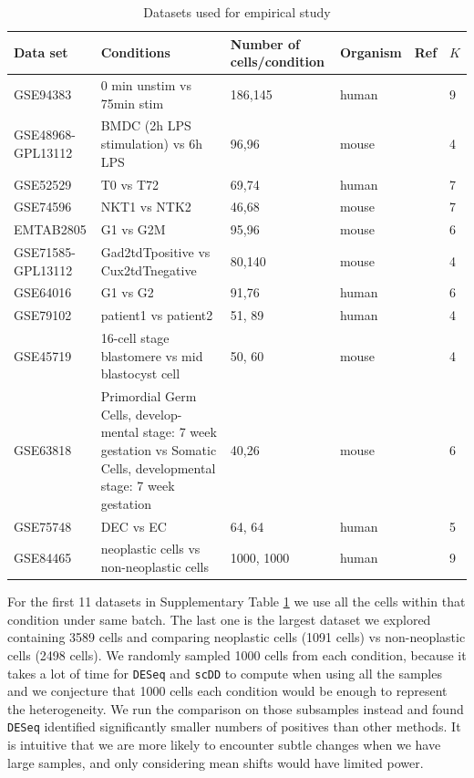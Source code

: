\documentclass[aoas,preprint]{imsart}
\begin{document}
\begin{table}[h!]
\small
\centering
\begin{tabular}{ |p{2cm}|p{5cm}|p{2cm}|p{2cm}|p{2cm}|p{1cm}|}
\hline
 Data set & Conditions & Number of cells/condition & Organism  & Ref & $K$\\ \hline \hline
GSE94383 & 0 min unstim vs 75min stim & 186,145 & human & \citep{Lane} & 9\\ \hline
GSE48968-GPL13112 & BMDC (2h LPS stimulation) vs 6h LPS & 96,96 & mouse & \citep{Shalek} & 4\\ \hline
GSE52529 & T0 vs T72 & 69,74 & human & \citep{Trapnell} & 7\\ \hline
GSE74596 & NKT1 vs NTK2 & 46,68 & mouse & \citep{Engel} & 7\\ \hline
EMTAB2805 & G1 vs G2M & 95,96 & mouse & \citep{EMTAB} & 6\\ \hline
GSE71585-GPL13112 &Gad2tdTpositive vs Cux2tdTnegative  & 80,140 & mouse & \citep{Tasic} & 4\\ \hline
GSE64016 & G1 vs G2 & 91,76 & human & \citep{oscope} & 6\\ \hline
GSE79102 & patient1 vs patient2 & 51, 89 & human & \cite{sc3} & 4\\ \hline
GSE45719 & 16-cell stage blastomere vs mid blastocyst cell & 50, 60 & mouse & \citep{Deng193} & 4\\ \hline
GSE63818 & Primordial Germ Cells, develop- mental stage: 7 week gestation vs Somatic Cells, developmental stage: 7 week gestation & 40,26 & mouse & \citep{Guo} & 6\\ \hline
GSE75748 & DEC vs EC & 64, 64 & human & \citep{chu} & 5\\ \hline
GSE84465 & neoplastic cells vs non-neoplastic cells & 1000, 1000 & human & \citep{Darmanis} & 9\\ \hline
\end{tabular}
\caption{Datasets used for empirical study}
\label{table:1}
\end{table}

For the first 11 datasets in Supplementary Table \ref{table:1} we use all the cells within that condition under same batch.
The last one is the largest dataset we explored containing 3589 cells and comparing neoplastic cells (1091 cells) vs non-neoplastic cells (2498 cells).
We randomly sampled 1000 cells from each condition, because it takes a lot of time for \texttt{DESeq} and \texttt{scDD} to compute when using all the samples
and we conjecture that 1000 cells each condition would be enough to represent the heterogeneity. %
We run the comparison on those subsamples instead 
and found \texttt{DESeq} identified significantly smaller numbers of positives than other methods. It is intuitive that we are more likely to encounter subtle changes
when we have large samples, and only considering mean shifts would have limited power. 
\end{document}
